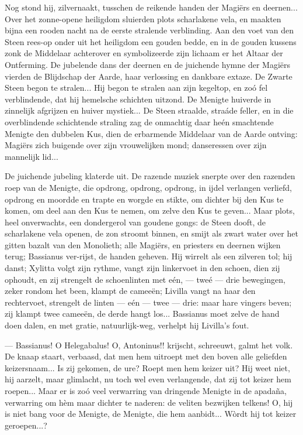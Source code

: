 \documentclass[a4paper, 12pt, oneside, dutch]{article}
\begin{document}
Nog stond hij, zilvernaakt, tusschen de reikende handen der Magiërs en deernen... Over het zonne-opene heiligdom sluierden plots scharlakene vela, en maakten bijna een rooden nacht na de eerste stralende verblinding. Aan den voet van den Steen rees-op onder uit het heiligdom een gouden bedde, en in de gouden kussens zonk de Middelaar achterover en symbolizeerde zijn lichaam er het Altaar der Ontferming. De jubelende dans der deernen en de juichende hymne der Magiërs vierden de Blijdschap der Aarde, haar verlossing en dankbare extaze. De Zwarte Steen begon te stralen... Hij begon te stralen aan zijn kegeltop, en zoó fel verblindende, dat hij hemelsche schichten uitzond. De Menigte huiverde in zinnelijk afgrijzen en huiver mystiek... De Steen straalde, straáde feller, en in die overblindende schichtende straling zag de onmachtig daar heén smachtende Menigte den dubbelen Kus, dien de erbarmende Middelaar van de Aarde ontving: Magiërs zich buigende over zijn vrouwelijken mond; danseressen over zijn mannelijk lid...

De juichende jubeling klaterde uit. De razende muziek snerpte over den razenden roep van de Menigte, die opdrong, opdrong, opdrong, in ijdel verlangen verliefd, opdrong en moordde en trapte en worgde en stikte, om dichter bij den Kus te komen, om deel aan den Kus te nemen, om zelve den Kus te geven... Maar plots, heel onverwachts, een dondergerol van goudene gongs: de Steen dooft, de scharlakene vela openen, de zon stroomt binnen, en smijt als zwart water over het gitten bazalt van den Monolieth; alle Magiërs, en priesters en deernen wijken terug; Bassianus ver-rijst, de handen geheven. Hij wirrelt als een zilveren tol; hij danst; Xylitta volgt zijn rythme, vangt zijn linkervoet in den schoen, dien zij ophoudt, en zij strengelt de schoenlinten met eén, --- tweé --- drie bewegingen, zeker rondom het been, klampt de cameeën; Livilla vangt na haar den rechtervoet, strengelt de linten --- eén --- twee --- drie: maar hare vingers beven; zij klampt twee cameeën, de derde hangt los... Bassianus moet zelve de hand doen dalen, en met gratie, natuurlijk-weg, verhelpt hij Livilla's fout.

--- Bassianus! O Helegabalus! O, Antoninus!! krijscht, schreeuwt, galmt het volk. De knaap staart, verbaasd, dat men hem uitroept met den boven alle geliefden keizersnaam... Is zij gekomen, de ure? Roept men hem keizer uit? Hij weet niet, hij aarzelt, maar glimlacht, nu toch wel even verlangende, dat zij tot keizer hem roepen... Maar er is zoó veel verwarring van dringende Menigte in de apadaña, verwarring om hèm maar dichter te naderen: de veliten bezwijken telkens! O, hij is niet bang voor de Menigte, de Menigte, die hem aanbidt... Wòrdt hij tot keizer geroepen...?
\end{document}
